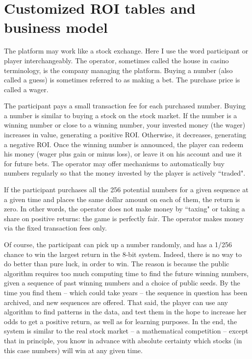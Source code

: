 \documentclass[oneside,10pt]{book}
\begin{document}
\section{Customized ROI tables and business model}

The platform may work like a stock exchange. Here I use the word participant or player interchangeably. The operator, sometimes called the house in casino terminology, is the company managing the platform. Buying a number (also called a guess) is sometimes referred to as making a bet. The purchase price is called a wager.

The participant pays a small transaction fee for each purchased number. Buying a number is similar to buying a stock on the stock market. If the number is a winning number or close to a winning number, your invested money (the wager) increases in value, generating a positive ROI. Otherwise, it decreases, generating a negative ROI. Once the winning number is announced, the player can redeem his money (wager plus gain or minus loss), or leave it on his account and use it for future bets. The operator may offer mechanisms to automatically buy numbers regularly so that the money invested by the player is actively ``traded".


If the participant purchases all the 256 potential numbers for a given sequence at a given time and places the same dollar amount on each of them, the return is zero. In other words, the operator does not make money by ``taxing" or taking a share on positive returns: the game is perfectly fair. The operator makes money via the fixed transaction fees only.

Of course, the participant can pick up a number randomly, and has a 1/256 chance to win the largest return in the 8-bit system. Indeed, there is no way to do better than pure luck, in order to win. The reason is because the public algorithm requires too much computing time to find the future winning numbers, given a sequence of past winning numbers and a choice of public seeds. By the time you find them -- which could take years -- the sequence in question has been archived, and new sequences are offered. That said, the player can use any algorithm to find patterns in the data, and test them in the hope to increase her odds to get a positive return, as well as for learning purposes. In the end, the system is similar to the real stock market -- a mathematical competition -- except
 that in principle, you know in advance with absolute certainty which stocks  (in this case numbers)  will win at any given time.
\end{document}

